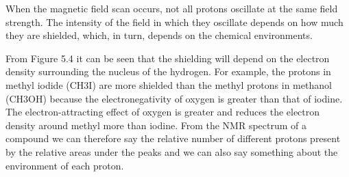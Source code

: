 When the magnetic field scan occurs, not all protons oscillate at the same field strength. The intensity of the field in which they oscillate depends on how much they are shielded, which, in turn, depends on the chemical environments.

From Figure 5.4 it can be seen that the shielding will depend on the electron density surrounding the nucleus of the hydrogen. For example, the protons in methyl iodide (CH3I) are more shielded than the methyl protons in methanol (CH3OH) because the electronegativity of oxygen is greater than that of iodine. The electron-attracting effect of oxygen is greater and reduces the electron density around methyl more than iodine. From the NMR spectrum of a compound we can therefore say the relative number of different protons present by the relative areas under the peaks and we can also say something about the environment of each proton.